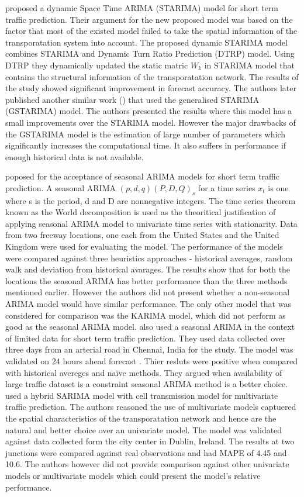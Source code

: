 \citet{min2009short} proposed a dynamic Space Time ARIMA (STARIMA) model for short term traffic
prediction. Their argument for the new proposed model was based on the factor that most of the
existed model failed to take the spatial information of the transporatation system into account.
The proposed dynamic STARIMA model combines STARIMA and Dynamic Turn Ratio Prediction (DTRP)
model. Using DTRP they dynamically updated the static matric $W_{k}$ in STARIMA model that contains
the structural information of the transporatation network. The results of the study showed
significant improvement in forecast accuracy. The authors later published another similar work
(\citet{min2010urban}) that used the generalised STARIMA (GSTARIMA) model.  The authors
presented the results where this model has a small improvements over the STARIMA model. However
the major drawbacks of the GSTARIMA model is the estimation of large number of parameters which
significantly increases the computational time. It also suffers in performance if enough historical
data is not available.

\citet{williams2003modeling} poposed for the acceptance of seasonal ARIMA models for short term
traffic prediction. A seasonal ARIMA $(p,d,q) (P,D,Q)_{s}$ for a time series {$x_{t}$} is one
where s is the period, d and D are nonnegative integers. The time series theorem known as the World
decomposition is used as the theoritical justification of applying seasonal ARIMA model to
univariate time series with stationarity. Data from two freeway locations, one each from the
United States and the United Kingdom were used for evaluating the model. The performance of the
models were compared against three heuristics approaches - historical averages, random walk and
deviation from historical avarages. The results show that for both the locations the seasonal
ARIMA has better performance than the three methods mentioned earlier. However the authors did
not present whether a non-seasonal ARIMA model would have similar performance. The only other
model that was considered for comparison was the KARIMA model, which did not perform as good as
the seasonal ARIMA model. \citet{kumar2015short} also used a seasonal ARIMA in the context of
limited data for short term traffic prediction. They used data collected over three days from an
arterial road in Chennai, India for the study. The model was validated on 24 hours ahead forecast
. Thier resluts were positive when compared with historical avereges and naïve methods. They
argued when availability of large traffic dataset is a constraint seasonal ARIMA method is a
better choice. \citet{szeto2009multivariate} used a hybrid SARIMA model with cell transmission
model for multivariate traffic prediction. The authors reasoned the use of multivariate models
captuered the spatial characteristics of the transporatation network and hence are the natural
and better choice over an univariate model. The model was validated against data collected form
the city center in Dublin, Ireland. The results at two junctions were compared against real
observations and had MAPE of 4.45 and 10.6. The authors however did not provide comparison
against other univariate models or multivariate models which could present the model's relative
performance.

